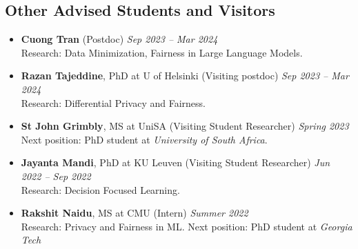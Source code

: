 \subsection*{Other Advised Students and Visitors}
\begin{itemize}
  \item \textbf{Cuong Tran} ({\sc Postdoc}) 
  \hfill{\em Sep 2023 -- Mar 2024}\\
  {\sc Research}: Data Minimization, Fairness in Large Language Models.

  \item \textbf{Razan Tajeddine}, PhD at U of Helsinki ({\sc Visiting postdoc}) 
  \hfill{\em Sep 2023 -- Mar 2024}\\
  {\sc Research}: Differential Privacy and Fairness.

  \item \textbf{St John Grimbly}, MS at UniSA ({\sc Visiting Student Researcher}) 
  \hfill{\em Spring 2023}\\
  {\sc Next position:} PhD student at \textit{University of South Africa}.

  \item \textbf{Jayanta Mandi}, PhD at KU Leuven ({\sc Visiting Student Researcher}) 
  \hfill{\em Jun 2022 -- Sep 2022}\\
  {\sc Research}: Decision Focused Learning.

  \item \textbf{Rakshit Naidu}, MS at CMU ({\sc Intern}) \hfill{\em Summer 2022}\\
  {\sc Research:} Privacy and Fairness in ML. 
  {\sc Next position:} PhD student at \textit{Georgia Tech}
\end{itemize}

